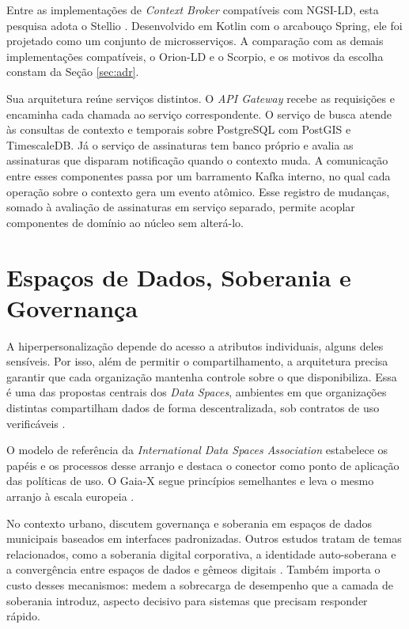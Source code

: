 Entre as implementações de \textit{Context Broker} compatíveis com NGSI-LD, esta pesquisa adota o Stellio \cite{stellio2025docs}. Desenvolvido em Kotlin com o arcabouço Spring, ele foi projetado como um conjunto de microsserviços. A comparação com as demais implementações compatíveis, o Orion-LD e o Scorpio, e os motivos da escolha constam da Seção \ref{sec:adr}.

Sua arquitetura reúne serviços distintos. O \textit{API Gateway} recebe as requisições e encaminha cada chamada ao serviço correspondente. O serviço de busca atende às consultas de contexto e temporais sobre PostgreSQL com PostGIS e TimescaleDB. Já o serviço de assinaturas tem banco próprio e avalia as assinaturas que disparam notificação quando o contexto muda. A comunicação entre esses componentes passa por um barramento Kafka interno, no qual cada operação sobre o contexto gera um evento atômico. Esse registro de mudanças, somado à avaliação de assinaturas em serviço separado, permite acoplar componentes de domínio ao núcleo sem alterá-lo.

\section{Espaços de Dados, Soberania e Governança}
\label{sec:dataspaces}

A hiperpersonalização depende do acesso a atributos individuais, alguns deles sensíveis. Por isso, além de permitir o compartilhamento, a arquitetura precisa garantir que cada organização mantenha controle sobre o que disponibiliza. Essa é uma das propostas centrais dos \textit{Data Spaces}, ambientes em que organizações distintas compartilham dados de forma descentralizada, sob contratos de uso verificáveis \cite{otto2019international}.

O modelo de referência da \textit{International Data Spaces Association} \cite{idsa2022ram} estabelece os papéis e os processos desse arranjo e destaca o conector como ponto de aplicação das políticas de uso. O Gaia-X segue princípios semelhantes e leva o mesmo arranjo à escala europeia \cite{gaiax2022architecture,tardieu2022role}.

No contexto urbano,  discutem governança e soberania em espaços de dados municipais baseados em interfaces padronizadas. Outros estudos tratam de temas relacionados, como a soberania digital corporativa, a identidade auto-soberana e a convergência entre espaços de dados e gêmeos digitais \cite{sanchezserna2026data,somma2023digital,uslander2022symbiotic}. Também importa o custo desses mecanismos:  medem a sobrecarga de desempenho que a camada de soberania introduz, aspecto decisivo para sistemas que precisam responder rápido.

